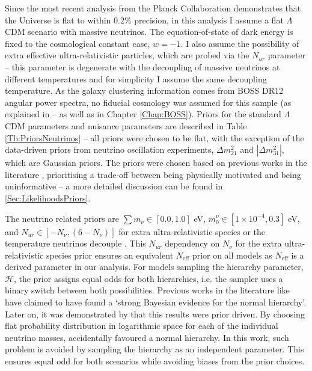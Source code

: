 Since the most recent analysis from the Planck Collaboration demonstrates that the Universe is flat to within 0.2\% precision, in this analysis I assume a flat $\Lambda$CDM scenario with massive neutrinos. The equation-of-state of dark energy is fixed to the cosmological constant case, $w=-1$. I also assume the possibility of extra effective ultra-relativistic particles, which are probed via the $N_{ur}$ parameter -- this parameter is degenerate with the decoupling of massive neutrinos at different temperatures and for simplicity I assume the same decoupling temperature. As the galaxy clustering information comes from BOSS DR12 angular power spectra, no fiducial cosmology was assumed for this sample (as explained in \cite{2018LoureiroBOSS} -- as well as in Chapter \ref{Chap:BOSS}). Priors for the standard $\Lambda$CDM parameters and nuisance parameters are described in Table \ref{Tb:PriorsNeutrinos} -- all priors were chosen to be flat, with the exception of the data-driven priors from neutrino oscillation experiments, $\Delta m_{21}^2$ and $|\Delta m_{31}^2|$, which are Gaussian priors. The priors were chosen based on previous works in the literature \citep{JLAdata,2016BOSSCosmology,PlanckCosmology2016,2017arXiv170801530D}, prioritising a trade-off between being physically motivated and being uninformative -- a more detailed discussion can be found in \ref{Sec:LikelihoodsPriors}. 

\qquad The neutrino related priors are $\sum m_{\nu} \in [0.0, 1.0]$ eV, $m_{0}^{\nu} \in [1\times 10^{-4},0.3]$ eV, and $N_{ur} \in [-N_{\nu},(6-N_{\nu})]$ for extra ultra-relativistic species or the temperature neutrinos decouple \citep{2012Julien-Deg}. This $N_{ur}$ dependency on $N_{\nu}$ for the extra ultra-relativistic species prior ensures an equivalent $N_{\text{eff}}$ prior on all models as $N_{\text{eff}}$ is a derived parameter in our analysis. For models sampling the hierarchy parameter, $\mathcal{H}$, the prior assigns equal odds for both hierarchies, i.e. the sampler uses a binary switch between both possibilities. Previous works in the literature like \cite{2017Simpson-Hier} have claimed to have found a `strong Bayesian evidence for the normal hierarchy'. Later on, it was demonstrated by \cite{2017-CommentSimpson} that this results were prior driven. By choosing flat probability distribution in logarithmic space for each of the individual neutrino masses, \cite{2017Simpson-Hier} accidentally favoured a normal hierarchy. In this work, such problem is avoided by sampling the hierarchy as an independent parameter. This ensures equal odd for both scenarios while avoiding biases from the prior choices.


